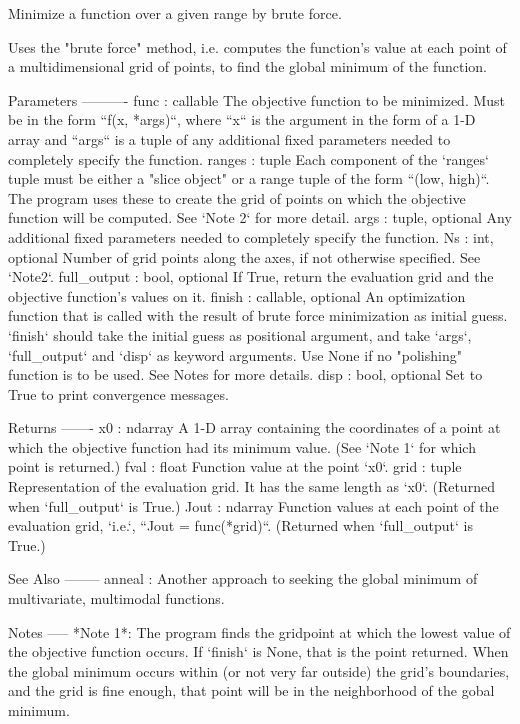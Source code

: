 \begin{DoxyVerb}Minimize a function over a given range by brute force.

Uses the "brute force" method, i.e. computes the function's value
at each point of a multidimensional grid of points, to find the global
minimum of the function.

Parameters
----------
func : callable
    The objective function to be minimized. Must be in the
    form ``f(x, *args)``, where ``x`` is the argument in
    the form of a 1-D array and ``args`` is a tuple of any
    additional fixed parameters needed to completely specify
    the function.
ranges : tuple
    Each component of the `ranges` tuple must be either a
    "slice object" or a range tuple of the form ``(low, high)``.
    The program uses these to create the grid of points on which
    the objective function will be computed. See `Note 2` for
    more detail.
args : tuple, optional
    Any additional fixed parameters needed to completely specify
    the function.
Ns : int, optional
    Number of grid points along the axes, if not otherwise
    specified. See `Note2`.
full_output : bool, optional
    If True, return the evaluation grid and the objective function's
    values on it.
finish : callable, optional
    An optimization function that is called with the result of brute force
    minimization as initial guess.  `finish` should take the initial guess
    as positional argument, and take `args`, `full_output` and `disp`
    as keyword arguments.  Use None if no "polishing" function is to be
    used.  See Notes for more details.
disp : bool, optional
    Set to True to print convergence messages.

Returns
-------
x0 : ndarray
    A 1-D array containing the coordinates of a point at which the
    objective function had its minimum value. (See `Note 1` for
    which point is returned.)
fval : float
    Function value at the point `x0`.
grid : tuple
    Representation of the evaluation grid.  It has the same
    length as `x0`. (Returned when `full_output` is True.)
Jout : ndarray
    Function values at each point of the evaluation
    grid, `i.e.`, ``Jout = func(*grid)``. (Returned
    when `full_output` is True.)

See Also
--------
anneal : Another approach to seeking the global minimum of
multivariate, multimodal functions.

Notes
-----
*Note 1*: The program finds the gridpoint at which the lowest value
of the objective function occurs.  If `finish` is None, that is the
point returned.  When the global minimum occurs within (or not very far
outside) the grid's boundaries, and the grid is fine enough, that
point will be in the neighborhood of the gobal minimum.


\end{DoxyVerb}
